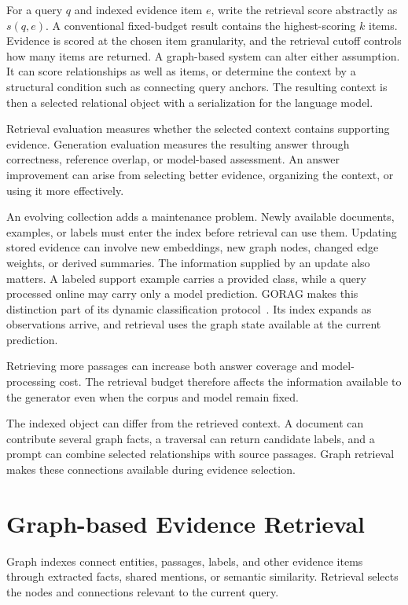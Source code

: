 For a query $q$ and indexed evidence item $e$, write the retrieval score abstractly as $s(q,e)$. A conventional fixed-budget result contains the highest-scoring $k$ items. Evidence is scored at the chosen item granularity, and the retrieval cutoff controls how many items are returned. A graph-based system can alter either assumption. It can score relationships as well as items, or determine the context by a structural condition such as connecting query anchors. The resulting context is then a selected relational object with a serialization for the language model.

Retrieval evaluation measures whether the selected context contains supporting evidence. Generation evaluation measures the resulting answer through correctness, reference overlap, or model-based assessment. An answer improvement can arise from selecting better evidence, organizing the context, or using it more effectively.

An evolving collection adds a maintenance problem. Newly available documents, examples, or labels must enter the index before retrieval can use them. Updating stored evidence can involve new embeddings, new graph nodes, changed edge weights, or derived summaries. The information supplied by an update also matters. A labeled support example carries a provided class, while a query processed online may carry only a model prediction. GORAG makes this distinction part of its dynamic classification protocol~\cite{bg-gorag}. Its index expands as observations arrive, and retrieval uses the graph state available at the current prediction.

Retrieving more passages can increase both answer coverage and model-processing cost. The retrieval budget therefore affects the information available to the generator even when the corpus and model remain fixed.

The indexed object can differ from the retrieved context. A document can contribute several graph facts, a traversal can return candidate labels, and a prompt can combine selected relationships with source passages. Graph retrieval makes these connections available during evidence selection.

\section{Graph-based Evidence Retrieval}
\label{sec:background:graph-retrieval}

Graph indexes connect entities, passages, labels, and other evidence items through extracted facts, shared mentions, or semantic similarity. Retrieval selects the nodes and connections relevant to the current query.

